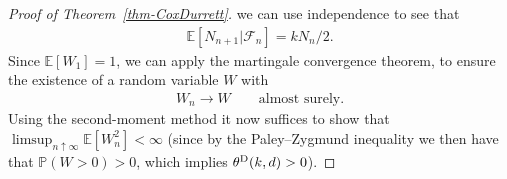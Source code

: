 \documentclass[oneside]{amsart}
\newcommand{\N}{\mathbb{N}}
\theoremstyle{definition}
\renewcommand{\P}{\mathbb{P}}
\newcommand{\1}{\mathbbm{1}}
\newcommand{\E}{\mathbb{E}}
\newcommand{\0}{\mathbf{o}}
\newcommand*{\be}{\begin{equation}}
\newcommand*{\ee}{\end{equation}}
\newcommand*{\ba}{\begin{aligned}}
\newcommand*{\ea}{\end{aligned}}
\newcommand{\basc}[1]{{\color{blue}{ \bf [~Bas:\ }\emph{#1}\textbf{~]}}}
\numberwithin{equation}{section}
\begin{document}
\begin{proof}[Proof of Theorem~\ref{thm-CoxDurrett}]

we can use independence to see that 
\begin{align*}
\E[N_{n+1}|\mathcal F_n]=kN_n/2.
\end{align*}
Since $\E[W_1]=1$, we can apply the martingale convergence theorem, to ensure the existence of a random variable $W$ with 
\begin{align*}
W_n\to W\qquad \text{almost surely}.
\end{align*}
Using the second-moment method it now suffices to show that $\limsup_{n\uparrow\infty}\E[W_n^2]<\infty$ (since by the Paley–Zygmund inequality we then have that $\P(W>0)>0$, which implies $\theta^{\rm D}(k,d)>0$).


\end{proof}
\end{document}
